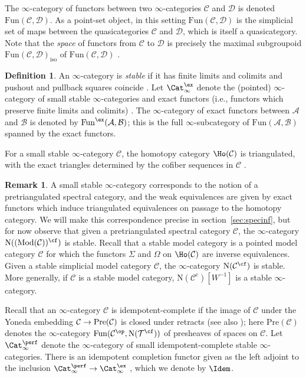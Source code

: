 \documentclass{amsart}
\renewcommand{\to}{\mathchoice{\longrightarrow}{\rightarrow}{\rightarrow}{\rightarrow}}
\let\catsymbfont\mathcal
\newcommand{\aA}{{\catsymbfont{A}}}
\newcommand{\aB}{{\catsymbfont{B}}}
\newcommand{\aC}{{\catsymbfont{C}}}
\newcommand{\aD}{{\catsymbfont{D}}}
\newcommand{\aT}{{\catsymbfont{T}}}
\newcommand{\N}{\mathrm{N}}
\newcommand{\modules}[1]{\mathrm{Mod}(#1)}
\newcommand{\PPre}{\mathrm{Pre}}
\newcommand{\stabcat}{\Cat_\i^{\ex}}
\newcommand{\idemstabcat}{\Cat_\i^{\perf}}
\newcommand{\Fun}{\mathrm{Fun}} %
\renewcommand{\i}{\infty}
\numberwithin{equation}{section}
\theoremstyle{definition}
\newtheorem{definition}[equation]{Definition}
\newtheorem{remark}[equation]{Remark}
\begin{document}
The $\i$-category of functors between two $\i$-categories $\aC$ and
$\aD$ is denoted $\Fun(\aC, \aD)$.  As a point-set object, in this
setting $\Fun(\aC, \aD)$ is the simplicial set of maps between the
quasicategories $\aC$ and $\aD$, which is itself a quasicategory.
Note that the {\em space} of functors from $\aC$ to $\aD$ is precisely
the maximal subgroupoid $\Fun(\aC,\aD)_{\mathrm{iso}}$ of
$\Fun(\aC,\aD)$ \cite[1.2.5.3, 3.0.0.1]{HTT}.

\begin{definition}
An $\i$-category is {\em stable} \cite[1.1.1.9]{HAG} if it has finite limits
and colimits and pushout and pullback squares
coincide \cite[1.1.3.4]{HAG}.  Let $\stabcat$ denote the (pointed)
$\infty$-category of small stable $\i$-categories and exact functors (i.e.,
functors which preserve finite limits and colimits) \cite[\S
1.1.4]{HAG}.  The $\i$-category of exact functors between $\aA$ and
$\aB$ is denoted by $\Fun^{\ex}(\aA, \aB)$; this is the full
$\i$-subcategory of $\Fun(\aA,\aB)$ spanned by the exact functors.
\end{definition}

For a small stable $\i$-category $\aC$, the homotopy
category $\Ho(\aC)$ is triangulated, with the exact triangles
determined by the cofiber sequences in $\aC$ \cite[1.1.2.13]{HAG}.

\begin{remark}\label{rem:pretriangstab}
A small stable $\i$-category corresponds to the notion of a
pretriangulated spectral category, and the weak equivalences are
given by exact functors which induce triangulated equivalences on
passage to the homotopy category.  We will make this correspondence
precise in section~\ref{sec:specinf}, but for now observe that given a
pretriangulated spectral category $\aC$, the $\i$-category
$\N((\modules{\aC})^{\cf})$ is stable.  Recall that a stable model
category is a pointed model category $\aC$ for which the functors
$\Sigma$ and $\Omega$ on $\Ho(\aC)$ are inverse equivalences.  Given a
stable simplicial model category $\aC$, the $\i$-category
$\N(\aC^{\cf})$ is stable.  More generally, if $\aC$ is a stable
model category, $\N(\aC^{\mathrm{c}})[W^{-1}]$ is a stable $\i$-category.
\end{remark}

Recall that an $\i$-category $\aC$ is idempotent-complete if the image
of $\aC$ under the Yoneda embedding $\aC \to \PPre(\aC)$ is closed
under retracts (see also \cite[\S 4.4.5]{HTT}); here $\PPre(\aC)$
denotes the $\i$-category $\Fun(\aC^{\op}, \N(\aT^{\cf}))$ of
presheaves of spaces on $\aC$.  Let $\idemstabcat$ denote the
$\i$-category of small idempotent-complete stable $\i$-categories.
There is an idempotent completion functor given as the left adjoint to
the inclusion $\idemstabcat \to \stabcat$ \cite[5.1.4.2]{HTT}, which
we denote by $\Idem$.
\end{document}
